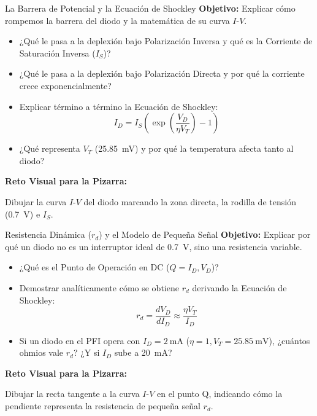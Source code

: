 \documentclass[11pt, a4paper]{article}
\newenvironment{reto}{%
    \vspace{0.3cm}
    \noindent\textbf{\faChalkboard \quad Reto Visual para la Pizarra: } \itshape
}{%
    \vspace{0.2cm}
}
\begin{document}
\begin{mision}{La Barrera de Potencial y la Ecuación de Shockley}
\textbf{Objetivo:} Explicar cómo rompemos la barrera del diodo y la matemática de su curva $I$-$V$.
\begin{itemize}
    \item ¿Qué le pasa a la deplexión bajo Polarización Inversa y qué es la Corriente de Saturación Inversa ($I_S$)?
    \item ¿Qué le pasa a la deplexión bajo Polarización Directa y por qué la corriente crece exponencialmente?
    \item Explicar término a término la Ecuación de Shockley:
    \begin{equation*}
        I_D = I_S \left( \exp\left(\frac{V_D}{\eta V_T}\right) - 1 \right)
    \end{equation*}
    \item ¿Qué representa $V_T$ (\qty{25.85}{\milli\volt}) y por qué la temperatura afecta tanto al diodo?
\end{itemize}
\begin{reto}
Dibujar la curva $I$-$V$ del diodo marcando la zona directa, la rodilla de tensión (\qty{0.7}{\volt}) e $I_S$.
\end{reto}
\end{mision}

\begin{mision}{Resistencia Dinámica ($r_d$) y el Modelo de Pequeña Señal}
\textbf{Objetivo:} Explicar por qué un diodo no es un interruptor ideal de \qty{0.7}{\volt}, sino una resistencia variable.
\begin{itemize}
    \item ¿Qué es el Punto de Operación en DC ($Q = I_D, V_D$)?
    \item Demostrar analíticamente cómo se obtiene $r_d$ derivando la Ecuación de Shockley:
    \begin{equation*}
        r_d = \frac{d V_D}{d I_D} \approx \frac{\eta V_T}{I_D}
    \end{equation*}
    \item Si un diodo en el PFI opera con $I_D = \qty{2}{\milli\ampere}$ ($\eta = 1, V_T = \qty{25.85}{\milli\volt}$), ¿cuántos ohmios vale $r_d$? ¿Y si $I_D$ sube a \qty{20}{\milli\ampere}?
\end{itemize}
\begin{reto}
Dibujar la recta tangente a la curva $I$-$V$ en el punto Q, indicando cómo la pendiente representa la resistencia de pequeña señal $r_d$.
\end{reto}
\end{mision}
\end{document}
